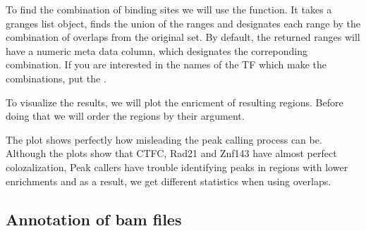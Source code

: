 \documentclass{article}\usepackage[]{graphicx}\usepackage[]{color}
\makeatletter
\newenvironment{kframe}{%
 \def\at@end@of@kframe{}%
 \ifinner\ifhmode%
  \def\at@end@of@kframe{\end{minipage}}%
  \begin{minipage}{\columnwidth}%
 \fi\fi%
 \def\FrameCommand##1{\hskip\@totalleftmargin \hskip-\fboxsep
 \colorbox{shadecolor}{##1}\hskip-\fboxsep
     \hskip-\linewidth \hskip-\@totalleftmargin \hskip\columnwidth}%
 \MakeFramed {\advance\hsize-\width
   \@totalleftmargin\z@ \linewidth\hsize
   \@setminipage}}%
 {\par\unskip\endMakeFramed%
 \at@end@of@kframe}
\newenvironment{knitrout}{}{} %
\makeatother
\begin{document}
To find the combination of binding sites we will use the  function.
It takes a granges list object, finds the union of the ranges and designates each
range by the combination of overlaps from the original set.
By default, the returned ranges will have a numeric  meta data column, which designates
the correponding combination. If you are interested in the names of the TF which make 
the combinations, put the .
\begin{knitrout}
\color{fgcolor}\begin{kframe}


{\ttfamily\noindent\bfseries{}}\end{kframe}
\end{knitrout}



To visualize the results, we will plot the enricment of resulting regions. Before doing that we will
order the regions by their  argument.
\begin{figure}
\begin{knitrout}
\color{fgcolor}\begin{kframe}


{\ttfamily\noindent\bfseries\color{errorcolor}{\#\# Error: object 'tf.comb' not found}}

{\ttfamily\noindent\bfseries{}}

{\ttfamily\noindent\bfseries\color{errorcolor}{\#\# Error: error in evaluating the argument 'x' in selecting a method for function 'match': Error: object 'sml' not found}}

{\ttfamily\noindent\bfseries{}}

{\ttfamily\noindent\bfseries{}}\end{kframe}
\end{knitrout}

\end{figure}
The plot shows perfectly how misleading the peak calling process can be. 
Although the plots show that CTFC, Rad21 and Znf143 have almost perfect colozalization,
Peak callers have trouble identifying peaks in regions with lower enrichments and as a 
result, we get different statistics when using overlaps.



\subsection{Annotation of bam files}
\end{document}

